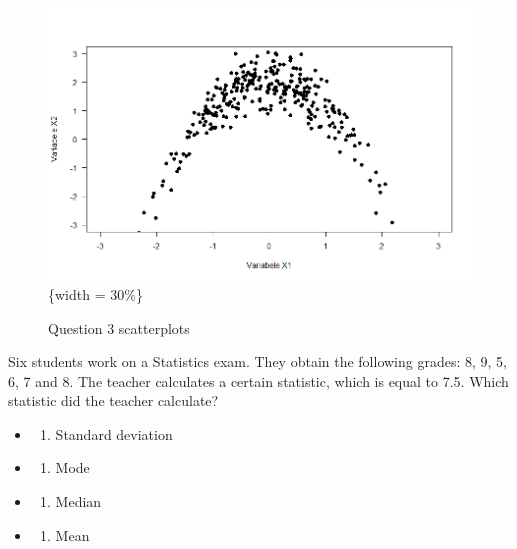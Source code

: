 \documentclass[
  letterpaper,
]{scrbook}
\providecommand{\tightlist}{%
  \setlength{\itemsep}{0pt}\setlength{\parskip}{0pt}}\usepackage{longtable,booktabs,array}
\begin{document}
\begin{figure}
\begin{minipage}[t]{0.33\linewidth}
{\includegraphics{images/lecture 76.png}\{width = 30\%\}

}

\end{minipage}%

\caption{\label{fig-scatter}Question 3 scatterplots}

\end{figure}

Six students work on a Statistics exam. They obtain the following
grades: 8, 9, 5, 6, 7 and 8. The teacher calculates a certain statistic,
which is equal to 7.5. Which statistic did the teacher calculate?

\begin{itemize}
\item
  \begin{enumerate}
  \def\labelenumi{(\Alph{enumi})}
  \tightlist
  \item
    Standard deviation\\
  \end{enumerate}
\item
  \begin{enumerate}
  \def\labelenumi{(\Alph{enumi})}
  \setcounter{enumi}{1}
  \tightlist
  \item
    Mode\\
  \end{enumerate}
\item
  \begin{enumerate}
  \def\labelenumi{(\Alph{enumi})}
  \setcounter{enumi}{2}
  \tightlist
  \item
    Median\\
  \end{enumerate}
\item
  \begin{enumerate}
  \def\labelenumi{(\Alph{enumi})}
  \setcounter{enumi}{3}
  \tightlist
  \item
    Mean\\
  \end{enumerate}
\end{itemize}
\end{document}
